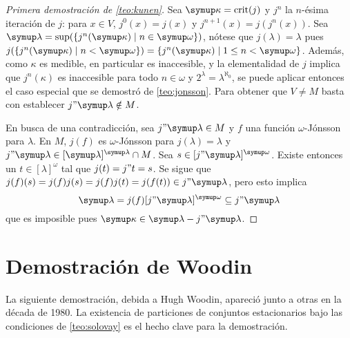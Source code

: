 \begin{proof}[Primera demostración de \ref{teo:kunen}]
    \bgroup\sloppy
    Sea $\kappa=\crit{j}$ y $j^n$ la $n$-ésima iteración de $j$: para $x\in V$, $j^0(x)=j(x)$
    y $j^{n+1}(x) = j(j^{n}(x))$. Sea $\lambda=\sup(\set{j^n(\kappa)\mid n\in\omega})$,
    nótese que $j(\lambda)=\lambda$ pues $j(\set{j^n(\kappa)\mid n<\omega}) = \set{j^n(\kappa)\mid 1\leq n<\omega}$.
    Además, como $\kappa$ es medible, en particular es inaccesible, y la elementalidad de $j$ implica que $j^n(\kappa)$
    es inaccesible para todo $n\in\omega$ y $2^\lambda = \lambda^{\aleph_0}$, se puede aplicar entonces
    el caso especial que se demostró de \ref{teo:jonsson}.
    Para obtener que $V\neq M$ basta con establecer $j"\lambda\notin M$.\par
    \egroup

    En busca de una contradicción, sea $j"\lambda\in M$ y $f$ una función $\omega$-Jónsson para $\lambda$.
    En $M$, $j(f)$ es $\omega$-Jónsson para $j(\lambda)=\lambda$ y $j"\lambda\in[\lambda]^\lambda\cap M$.
    Sea $s\in[j"\lambda]^\omega$. Existe entonces un $t\in[\lambda]^\omega$ tal que $j(t)=j"t=s$.
    Se sigue que $j(f)(s) = j(f)j(s) = j(f)j(t) = j(f(t))\in j"\lambda$, pero esto implica
    \[
        \lambda = j(f)[j"\lambda]^\omega \subseteq j"\lambda
    \]
    que es imposible pues $\kappa\in\lambda- j"\lambda$.
\end{proof}

\section{Demostración de Woodin}

La siguiente demostración, debida a Hugh Woodin, apareció junto a otras en
la década de 1980. La existencia de particiones de conjuntos estacionarios
bajo las condiciones de \ref{teo:solovay} es el hecho clave para la demostración.

